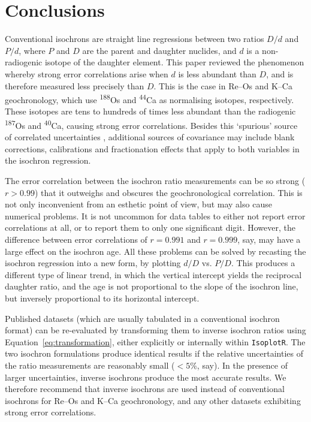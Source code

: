 \documentclass[]{article}
\begin{document}
\section{Conclusions}
\label{sec:conclusions}

Conventional isochrons are straight line regressions between two
ratios $D/d$ and $P/d$, where $P$ and $D$ are the parent and daughter
nuclides, and $d$ is a non-radiogenic isotope of the daughter
element. This paper reviewed the phenomenon whereby strong error
correlations arise when $d$ is less abundant than $D$, and is
therefore measured less precisely than $D$.  This is the case in
Re--Os and K--Ca geochronology, which use \textsuperscript{188}Os and
\textsuperscript{44}Ca as normalising isotopes, respectively.  These
isotopes are tens to hundreds of times less abundant than the
radiogenic \textsuperscript{187}Os and \textsuperscript{40}Ca, causing
strong error correlations. Besides this `spurious' source of
correlated uncertainties \citep[\emph{sensu}][]{pearson1896},
additional sources of covariance may include blank corrections,
calibrations and fractionation effects that apply to both variables in
the isochron regression.

The error correlation between the isochron ratio measurements can be
so strong ($r>0.99$) that it outweighs and obscures the
geochronological correlation.  This is not only inconvenient from an
esthetic point of view, but may also cause numerical problems.  It is
not uncommon for data tables to either not report error correlations
at all, or to report them to only one significant digit. However, the
difference between error correlations of $r=0.991$ and $r=0.999$, say,
may have a large effect on the isochron age. All these problems can be
solved by recasting the isochron regression into a new form, by
plotting $d/D$ vs. $P/D$.  This produces a different type of linear
trend, in which the vertical intercept yields the reciprocal daughter
ratio, and the age is not proportional to the slope of the isochron
line, but inversely proportional to its horizontal intercept.

Published datasets (which are usually tabulated in a conventional
isochron format) can be re-evaluated by transforming them to inverse
isochron ratios using Equation~\ref{eq:transformation}, either
explicitly or internally within \texttt{IsoplotR}. The two isochron
formulations produce identical results \citep{dalrymple1988} if the
relative uncertainties of the ratio measurements are reasonably small
($<5$\%, say). In the presence of larger uncertainties, inverse
isochrons produce the most accurate results. We therefore recommend
that inverse isochrons are used instead of conventional isochrons for
Re--Os and K--Ca geochronology, and any other datasets exhibiting
strong error correlations.
\end{document}

